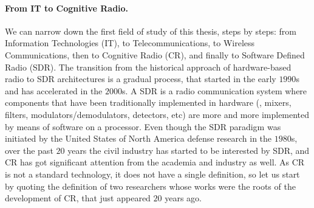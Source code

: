 \paragraph{From IT to Cognitive Radio.}
%
We can narrow down the first field of study of this thesis, steps by steps:
from Information Technologies (IT), to Telecommunications, to Wireless Communications, then to Cognitive Radio (CR),
and finally to Software Defined Radio (SDR).
%
The transition from the historical approach of hardware-based radio to SDR architectures is a gradual process, that started in the early $1990$s and has accelerated in the $2000$s.
A SDR is a radio communication system where components that have been traditionally implemented in hardware (\eg, mixers, filters, modulators/demodulators, detectors, etc) are more and more implemented by means of software on a processor.
Even though the SDR paradigm was initiated by the United States of North America defense research in the $1980$s, over the past $20$ years the civil industry has started to be interested by SDR, and CR has got significant attention from the academia and industry as well.
%
As CR is not a standard technology, it does not have a single definition, so let us start by quoting the definition of two researchers whose works were the roots of the development of CR, that just appeared $20$ years ago.
%
